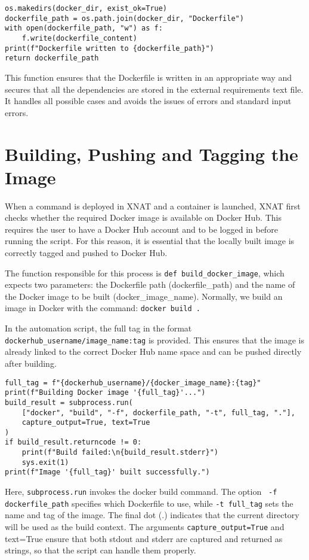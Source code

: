 \begin{lstlisting}
os.makedirs(docker_dir, exist_ok=True)
dockerfile_path = os.path.join(docker_dir, "Dockerfile")
with open(dockerfile_path, "w") as f:
    f.write(dockerfile_content)
print(f"Dockerfile written to {dockerfile_path}")
return dockerfile_path
\end{lstlisting}

This function ensures that the Dockerfile is written in an appropriate way and secures that all the dependencies are stored in the external requirements text file. It handles all possible cases and avoids the issues of errors and standard input errors.

\section{Building, Pushing and Tagging the Image}

When a command is deployed in XNAT and a container is launched, XNAT first checks whether the required Docker image is available on Docker Hub. This requires the user to have a Docker Hub account and to be logged in before running the script. For this reason, it is essential that the locally built image is correctly tagged and pushed to Docker Hub.

The function responsible for this process is \texttt{def build\_docker\_image}, which expects two parameters: the Dockerfile path (dockerfile\_path) and the name of the Docker image to be built (docker\_image\_name). Normally, we build an image in Docker with the command: \texttt{docker build .}


In the automation script, the full tag in the format \texttt{dockerhub\_username/image\_name:tag} is provided. This ensures that the image is already linked to the correct Docker Hub name space and can be pushed directly after building.
\begin{lstlisting}
full_tag = f"{dockerhub_username}/{docker_image_name}:{tag}"
print(f"Building Docker image '{full_tag}'...")
build_result = subprocess.run(
    ["docker", "build", "-f", dockerfile_path, "-t", full_tag, "."],
    capture_output=True, text=True
)
if build_result.returncode != 0:
    print(f"Build failed:\n{build_result.stderr}")
    sys.exit(1)
print(f"Image '{full_tag}' built successfully.")
\end{lstlisting}

Here, \texttt{subprocess.run} invokes the docker build command. The option \texttt{ -f dockerfile\_path} specifies which Dockerfile to use, while \texttt{-t full\_tag} sets the name and tag of the image. The final dot (.) indicates that the current directory will be used as the build context. The arguments \texttt{capture\_output=True} and text=True ensure that both stdout and stderr are captured and returned as strings, so that the script can handle them properly.

